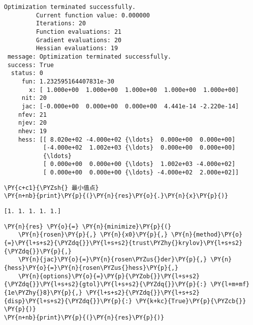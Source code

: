    \begin{Verbatim}[commandchars=\\\{\}]
Optimization terminated successfully.
         Current function value: 0.000000
         Iterations: 20
         Function evaluations: 21
         Gradient evaluations: 20
         Hessian evaluations: 19
 message: Optimization terminated successfully.
 success: True
  status: 0
     fun: 1.232595164407831e-30
       x: [ 1.000e+00  1.000e+00  1.000e+00  1.000e+00  1.000e+00]
     nit: 20
     jac: [-0.000e+00  0.000e+00  0.000e+00  4.441e-14 -2.220e-14]
    nfev: 21
    njev: 20
    nhev: 19
    hess: [[ 8.020e+02 -4.000e+02 {\ldots}  0.000e+00  0.000e+00]
           [-4.000e+02  1.002e+03 {\ldots}  0.000e+00  0.000e+00]
           {\ldots}
           [ 0.000e+00  0.000e+00 {\ldots}  1.002e+03 -4.000e+02]
           [ 0.000e+00  0.000e+00 {\ldots} -4.000e+02  2.000e+02]]
    \end{Verbatim}

    \begin{tcolorbox}[breakable, size=fbox, boxrule=1pt, pad at break*=1mm,colback=cellbackground, colframe=cellborder]
\begin{Verbatim}[commandchars=\\\{\}]
\PY{c+c1}{\PYZsh{} 最小值点}
\PY{n+nb}{print}\PY{p}{(}\PY{n}{res}\PY{o}{.}\PY{n}{x}\PY{p}{)}
\end{Verbatim}
\end{tcolorbox}

    \begin{Verbatim}[commandchars=\\\{\}]
[1. 1. 1. 1. 1.]
    \end{Verbatim}

    \begin{tcolorbox}[breakable, size=fbox, boxrule=1pt, pad at break*=1mm,colback=cellbackground, colframe=cellborder]
\begin{Verbatim}[commandchars=\\\{\}]
\PY{n}{res} \PY{o}{=} \PY{n}{minimize}\PY{p}{(}
    \PY{n}{rosen}\PY{p}{,} \PY{n}{x0}\PY{p}{,} \PY{n}{method}\PY{o}{=}\PY{l+s+s2}{\PYZdq{}}\PY{l+s+s2}{trust\PYZhy{}krylov}\PY{l+s+s2}{\PYZdq{}}\PY{p}{,}
    \PY{n}{jac}\PY{o}{=}\PY{n}{rosen\PYZus{}der}\PY{p}{,} \PY{n}{hess}\PY{o}{=}\PY{n}{rosen\PYZus{}hess}\PY{p}{,}
    \PY{n}{options}\PY{o}{=}\PY{p}{\PYZob{}}\PY{l+s+s2}{\PYZdq{}}\PY{l+s+s2}{gtol}\PY{l+s+s2}{\PYZdq{}}\PY{p}{:} \PY{l+m+mf}{1e\PYZhy{}8}\PY{p}{,} \PY{l+s+s2}{\PYZdq{}}\PY{l+s+s2}{disp}\PY{l+s+s2}{\PYZdq{}}\PY{p}{:} \PY{k+kc}{True}\PY{p}{\PYZcb{}}
\PY{p}{)}
\PY{n+nb}{print}\PY{p}{(}\PY{n}{res}\PY{p}{)}
\end{Verbatim}
\end{tcolorbox}

